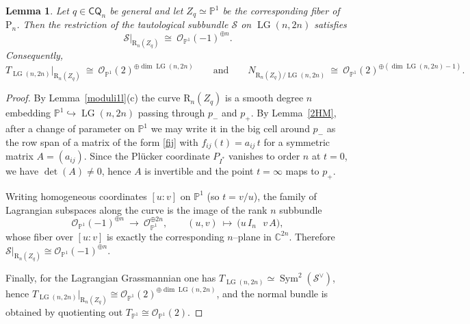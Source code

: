 \documentclass[10pt]{amsart}
\newtheorem{lemma}[theorem]{Lemma}
\theoremstyle{definition}
\newcommand{\C}{\mathbb{C}}
\newcommand{\Pbb}{\mathbb{P}}
\newcommand{\OO}{\mathcal{O}}
\newcommand{\LG}{\operatorname{LG}}
\newcommand{\CQ}{\mathsf{CQ}}
\DeclareMathOperator{\Sym}{Sym}
\newcommand{\RL}{\mathrm{R}}
\newcommand{\PL}{\mathrm{P}}
\theoremstyle{plain} %
\begin{document}
\begin{lemma}\label{lem:normal-Zq}
Let $q\in \CQ_n$ be general and let $Z_q\simeq \Pbb^1$ be the corresponding fiber of $\PL_n$.
Then the restriction of the tautological subbundle $\mathcal S$ on $\LG(n,2n)$ satisfies
\[
\mathcal S|_{\RL_n(Z_q)} \ \cong\ \OO_{\Pbb^1}(-1)^{\oplus n}.
\]
Consequently,
\[
T_{\LG(n,2n)}|_{\RL_n(Z_q)} \ \cong\ \OO_{\Pbb^1}(2)^{\oplus \dim \LG(n,2n)}
\qquad\text{and}\qquad
N_{\RL_n(Z_q)/\LG(n,2n)} \ \cong\ \OO_{\Pbb^1}(2)^{\oplus(\dim \LG(n,2n)-1)}.
\]
\end{lemma}

\begin{proof}
By Lemma~\ref{moduli1l}\textup{(c)} the curve $\RL_n(Z_q)$ is a smooth degree $n$ embedding $\Pbb^1\hookrightarrow \LG(n,2n)$ passing through $p_-$ and $p_+$.
By Lemma~\ref{2HM}, after a change of parameter on $\Pbb^1$ we may write it in the big cell around $p_-$ as the row span of a matrix of the form \eqref{fij} with
$f_{ij}(t)=a_{ij}\,t$ for a symmetric matrix $A=(a_{ij})$.
Since the Pl\"ucker coordinate $P_{I^*}$ vanishes to order $n$ at $t=0$, we have $\det(A)\neq 0$, hence $A$ is invertible and the point $t=\infty$ maps to $p_+$.

Writing homogeneous coordinates $[u:v]$ on $\Pbb^1$ (so $t=v/u$), the family of Lagrangian subspaces along the curve is the image of the rank $n$ subbundle
\[
\OO_{\Pbb^1}(-1)^{\oplus n}\ \longrightarrow\ \OO_{\Pbb^1}^{\oplus 2n},
\qquad
(u,v)\ \longmapsto\ \bigl(u\,I_n\ \ \ v\,A\bigr),
\]
whose fiber over $[u:v]$ is exactly the corresponding $n$--plane in $\C^{2n}$.
Therefore $\mathcal S|_{\RL_n(Z_q)}\cong \OO_{\Pbb^1}(-1)^{\oplus n}$.

Finally, for the Lagrangian Grassmannian one has $T_{\LG(n,2n)}\simeq \Sym^2(\mathcal S^\vee)$, hence
$T_{\LG(n,2n)}|_{\RL_n(Z_q)}\cong \OO_{\Pbb^1}(2)^{\oplus \dim \LG(n,2n)}$,
and the normal bundle is obtained by quotienting out $T_{\Pbb^1}\cong \OO_{\Pbb^1}(2)$.
\end{proof}
\end{document}
